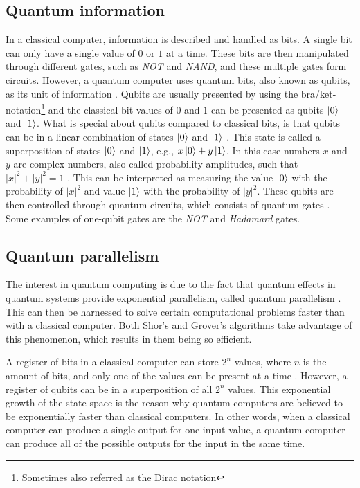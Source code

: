 \documentclass[english,oneside,openright]{UH_DS_report}
\begin{document}
\subsection{Quantum information}
In a classical computer, information is described and handled as bits. A single bit can only have a single value of $0$ or $1$ at a time. These bits are then manipulated through different gates, such as \emph{NOT} and \emph{NAND}, and these multiple gates form circuits. However, a quantum computer uses quantum bits, also known as qubits, as its unit of information \cite{introtoqc}. Qubits are usually presented by using the bra/ket-notation\footnote{Sometimes also referred as the Dirac notation} and the classical bit values of $0$ and $1$ can be presented as qubits $\ket{0}$ and $\ket{1}$. What is special about qubits compared to classical bits, is that qubits can be in a linear combination of states $\ket{0}$ and $\ket{1}$ \cite{lavor2003grover}. This state is called a superposition of states $\ket{0}$ and $\ket{1}$, e.g., $x \ket{0} + y \ket{1}$. In this case numbers $x$ and $y$ are complex numbers, also called probability amplitudes, such that $|x|^{2} + |y|^{2} = 1$ \cite{qcdb}. This can be interpreted as measuring the value $\ket{0}$ with the probability of $|x|^{2}$ and value $\ket{1}$ with the probability of $|y|^{2}$. These qubits are then controlled through quantum circuits, which consists of quantum gates \cite{lavor2003grover}. Some examples of one-qubit gates are the \emph{NOT} and \emph{Hadamard} gates.

\subsection{Quantum parallelism}
The interest in quantum computing is due to the fact that quantum effects in quantum systems provide exponential parallelism, called quantum parallelism \cite{introtoqc}. This can then be harnessed to solve certain computational problems faster than with a classical computer. Both Shor's and Grover's algorithms take advantage of this phenomenon, which results in them being so efficient.

 A register of bits in a classical computer can store $2^{n}$ values, where $n$ is the amount of bits, and only one of the values can be present at a time \cite{introtoqc}. However, a register of qubits can be in a superposition of all $2^{n}$ values. This exponential growth of the state space is the reason why quantum computers are believed to be exponentially faster than classical computers. In other words, when a classical computer can produce a single output for one input value, a quantum computer can produce all of the possible outputs for the input in the same time.
\end{document}
